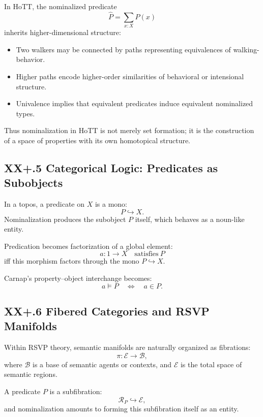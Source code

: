 \documentclass[12pt,letterpaper]{article}
\begin{document}
In HoTT, the nominalized predicate
\[
\widehat{P} = \sum_{x:X} P(x)
\]
inherits higher-dimensional structure:

\begin{itemize}
    \item Two walkers may be connected by paths representing equivalences of
    walking-behavior.
    \item Higher paths encode higher-order similarities of behavioral or
    intensional structure.
    \item Univalence implies that equivalent predicates induce equivalent
    nominalized types.
\end{itemize}

Thus nominalization in HoTT is not merely set formation; it is the construction
of a space of properties with its own homotopical structure.

\subsection{XX+.5 Categorical Logic: Predicates as Subobjects}

In a topos, a predicate on $X$ is a mono:
\[
P \hookrightarrow X.
\]
Nominalization produces the subobject $P$ itself, which behaves as a noun-like
entity.

Predication becomes factorization of a global element:
\[
a : 1 \to X \quad\text{satisfies}\ P
\]
iff this morphism factors through the mono $P \hookrightarrow X$.

Carnap’s property–object interchange becomes:
\[
a \models P \quad\Longleftrightarrow\quad a \in P.
\]

\subsection{XX+.6 Fibered Categories and RSVP Manifolds}

Within RSVP theory, semantic manifolds are naturally organized as fibrations:
\[
\pi : \mathcal{E} \to \mathcal{B},
\]
where $\mathcal{B}$ is a base of semantic agents or contexts, and $\mathcal{E}$
is the total space of semantic regions.

A predicate $P$ is a subfibration:
\[
\mathcal{R}_P \hookrightarrow \mathcal{E},
\]
and nominalization amounts to forming this subfibration itself as an entity.
\end{document}

